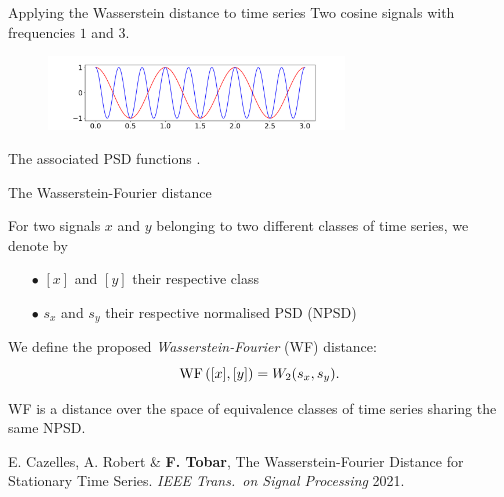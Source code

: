 \documentclass[pdf,aspectratio=169,10pt]{beamer}
\begin{document}
\begin{frame}{Applying the Wasserstein distance to time series}
Two cosine signals with frequencies $1$ and $3$.
\begin{figure}
\includegraphics[width=0.7\textwidth]{../img/cosinus.pdf}
\end{figure}
The associated PSD functions .  
 
\centering
{}
\end{frame}




\begin{frame}{ The Wasserstein-Fourier distance}
\thispagestyle{empty}
\begin{definition}
For two signals $x$ and $y$ belonging to two different classes of time series, we denote by
\begin{itemize}
\item[$\bullet$] $[x]$ and $[y]$ their respective class
\item[$\bullet$] $s_x$ and $s_y$ their respective normalised PSD (NPSD)
\end{itemize}
We define the proposed \textit{Wasserstein-Fourier} (WF) distance:
$$\operatorname{WF}\left([x],[y]\right)=W_2(s_x,s_y).$$
\end{definition}

\begin{theorem}
WF is a distance over the space of equivalence classes of time series
sharing the same NPSD.
\end{theorem}
\vfill

\noindent \footnotesize E. Cazelles, A. Robert \& \textbf{F. Tobar}, The Wasserstein-Fourier Distance for Stationary Time Series. \emph{IEEE Trans.~on Signal Processing} 2021.

\end{frame}
\end{document}
